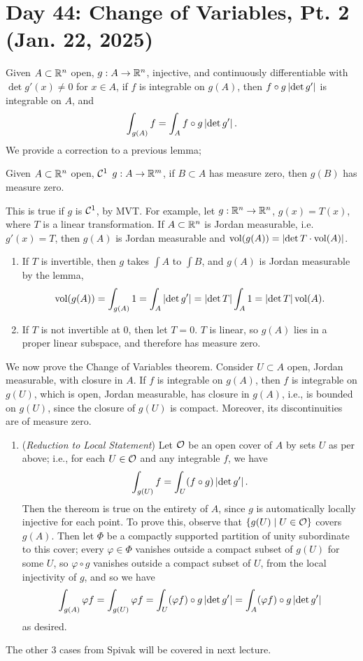 \section{Day 44: Change of Variables, Pt. 2 (Jan. 22, 2025)}
Given $A \subset \mathbb R^n$ open, $g : A \to \mathbb R^n$, injective, and continuously differentiable with $\det g'(x) \neq 0$ for $x \in A$, if $f$ is integrable on $g(A)$, then $f \circ g \left\lvert \det g' \right\rvert$ is integrable on $A$, and
\[ \int_{g(A)} f = \int_A f \circ g \left\lvert \det g' \right\rvert. \]
We provide a correction to a previous lemma;
\begin{simplelemma}
    Given $A \subset \mathbb R^n$ open, $\mathcal C^1$ $g : A \to \mathbb R^m$, if $B \subset A$ has measure zero, then $g(B)$ has measure zero.
\end{simplelemma}
\noindent This is true if $g$ is $\mathcal C^1$, by MVT.
\medskip\newline
For example, let $g : \mathbb R^n \to \mathbb R^n$, $g(x) = T(x)$, where $T$ is a linear transformation. If $A \subset \mathbb R^n$ is Jordan measurable, i.e. $g'(x) = T$, then $g(A)$ is Jordan measurable and $\mathrm{vol}(g(A)) = \left\lvert \det T \cdot \mathrm{vol}(A) \right\rvert$.
\begin{enumerate}[label=(\roman*)]
    \item If $T$ is invertible, then $g$ takes $\int A$ to $\int B$, and $g(A)$ is Jordan measurable by the lemma,
    \[ \mathrm{vol}(g(A)) = \int_{g(A)} 1 = \int_A \left\lvert \det g' \right\rvert = \left\lvert \det T \right\rvert \int_A 1 = \left\lvert \det T \right\rvert \mathrm{vol}(A). \]
    \item If $T$ is not invertible at $0$, then let $T = 0$. $T$ is linear, so $g(A)$ lies in a proper linear subspace, and therefore has measure zero.
\end{enumerate}
We now prove the Change of Variables theorem. Consider $U \subset A$ open, Jordan measurable, with closure in $A$. If $f$ is integrable on $g(A)$, then $f$ is integrable on $g(U)$, which is open, Jordan measurable, has closure in $g(A)$, i.e., is bounded on $g(U)$, since the closure of $g(U)$ is compact. Moreover, its discontinuities are of measure zero.
\begin{enumerate}[label=(\roman*)]
    \item (\textit{Reduction to Local Statement}) Let $\mathcal O$ be an open cover of $A$ by sets $U$ as per above; i.e., for each $U \in \mathcal O$ and any integrable $f$, we have
    \[ \int_{g(U)} f = \int_U (f \circ g) \left\lvert \det g' \right\rvert. \]
    Then the thereom is true on the entirety of $A$, since $g$ is automatically locally injective for each point. To prove this, observe that $\{g(U) \mid U \in \mathcal O\}$ covers $g(A)$. Then let $\Phi$ be a compactly supported partition of unity subordinate to this cover; every $\varphi \in \Phi$ vanishes outside a compact subset of $g(U)$ for some $U$, so $\varphi \circ g$ vanishes outside a compact subset of $U$, from the local injectivity of $g$, and so we have
    \[ \int_{g(A)} \varphi f = \int_{g(U)} \varphi f = \int_U (\varphi f) \circ g \left\lvert \det g' \right\rvert = \int_A (\varphi f) \circ g \left\lvert \det g' \right\rvert \]
    as desired.
\end{enumerate}
The other $3$ cases from Spivak will be covered in next lecture.